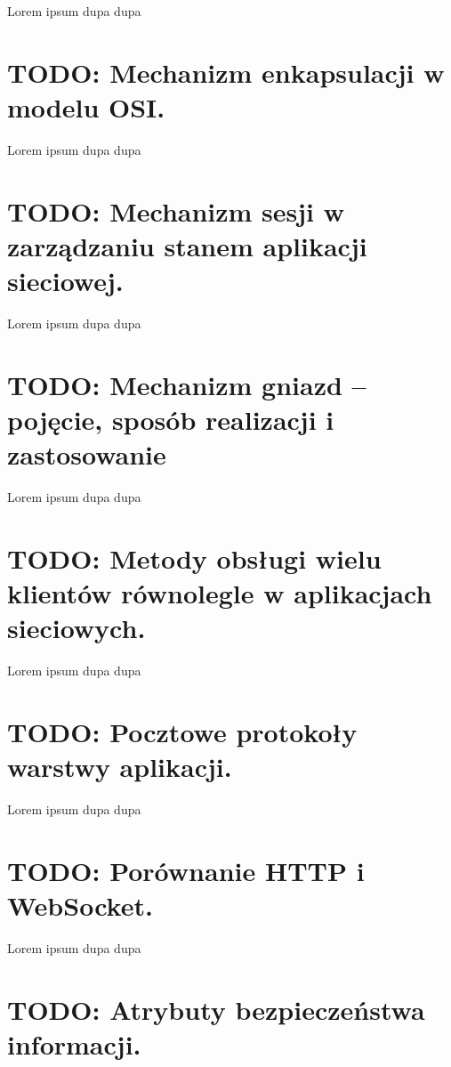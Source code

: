 \documentclass[a4paper,12pt,oneside]{book}
\begin{document}
		Lorem ipsum dupa dupa
		
		\setcounter{section}{12}
		\section{\color{red} TODO: Mechanizm enkapsulacji w modelu OSI. }
		
		Lorem ipsum dupa dupa
		
		\setcounter{section}{57}
		\section{\color{red} TODO: Mechanizm sesji w zarządzaniu stanem aplikacji sieciowej. }
		
		Lorem ipsum dupa dupa
		
		\setcounter{section}{58}
		\section{\color{red} TODO: Mechanizm gniazd – pojęcie, sposób realizacji i zastosowanie }
		
		Lorem ipsum dupa dupa
		
		\setcounter{section}{59}
		\section{\color{red} TODO: Metody obsługi wielu klientów równolegle w aplikacjach sieciowych.}
		
		Lorem ipsum dupa dupa
		
		\setcounter{section}{60}
		\section{\color{red} TODO: Pocztowe protokoły warstwy aplikacji. }
		
		Lorem ipsum dupa dupa
		
		\setcounter{section}{61}
		\section{\color{red} TODO: Porównanie HTTP i WebSocket. }
		
		Lorem ipsum dupa dupa
		
		\setcounter{section}{62}
		\section{\color{red} TODO: Atrybuty bezpieczeństwa informacji. }
		
\end{document}
